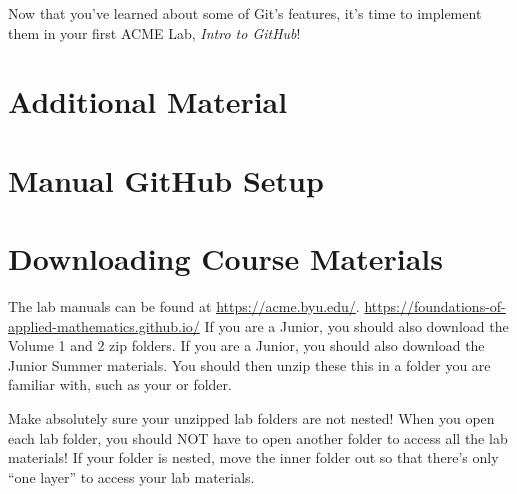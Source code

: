 Now that you've learned about some of Git's features, it's time to implement them in your first ACME Lab, \emph{Intro to GitHub}!
\fi

\newpage

\ifbyu
\ifbootcamp
\section*{Additional Material} %

\section*{Manual GitHub Setup}

\section*{Downloading Course Materials}
The lab manuals can be found at 
\ifbyu
\url{https://acme.byu.edu/}.
\else
\url{https://foundations-of-applied-mathematics.github.io/}
\fi
\ifbootcamp
If you are a Junior, you should also download the Volume 1 and 2 zip folders. 
\else
If you are a Junior, you should also download the Junior Summer materials.
\fi
You should then unzip 
\ifbootcamp
these
\else
this
\fi
in a folder you are familiar with, such as your  or  folder.
\begin{warn}
Make absolutely sure your unzipped lab folders are not nested!
When you open each lab folder, you should NOT have to open another folder to access all the lab materials!
If your folder is nested, move the inner folder out so that there's only ``one layer'' to access your lab materials.
\end{warn}

